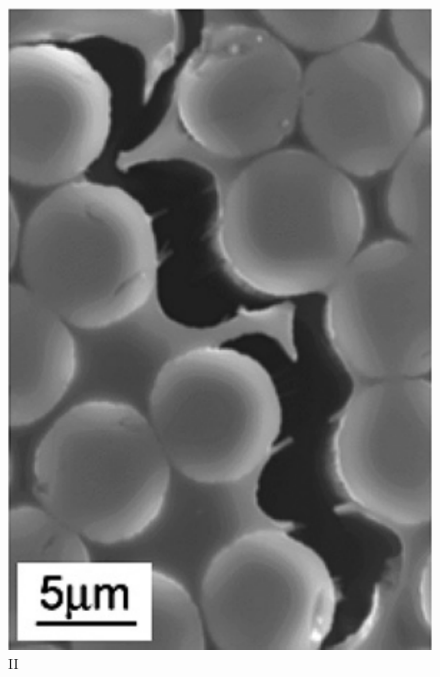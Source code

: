 \begin{subfigure}{0.32\linewidth}
  \setlength{\figwidth}{\linewidth}
  \centering
  \includegraphics[width=\figwidth,height=\figheight,keepaspectratio]{Exp_RVE_HobbiebrunkenT_woArrow_II}
  \caption{II}%
  \label{fig:Exp:RVE:HobbiebrunkenT:II}
\end{subfigure}%
\hfill
